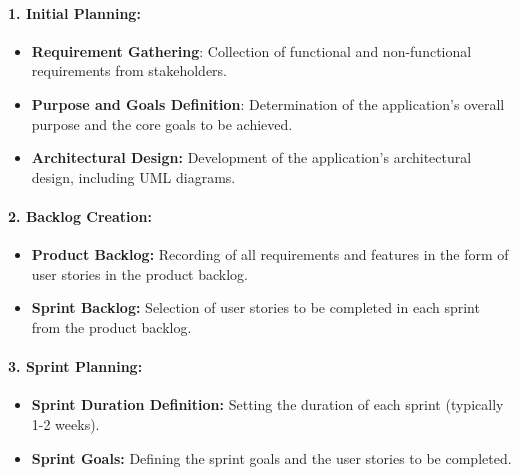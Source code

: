 \documentclass[unnumsec,webpdf,contemporary,large]{oup-authoring-template}%
\theoremstyle{thmstyleone}%
\theoremstyle{thmstyletwo}%
\theoremstyle{thmstylethree}%
\begin{document}
\paragraph{1. Initial Planning:}
\vspace{0.2cm}

\begin{itemize}
    \item \textbf{Requirement Gathering}: Collection of functional and non-functional requirements from stakeholders.
    \vspace{0.1cm}
    \item \textbf{Purpose and Goals Definition}: Determination of the application's overall purpose and the core goals to be achieved.
    \vspace{0.1cm}
    \item \textbf{Architectural Design:} Development of the application's architectural design, including UML diagrams.
\end{itemize}
\vspace{0.1cm}

\paragraph{2. Backlog Creation:}
\vspace{0.2cm}

\begin{itemize}
    \item \textbf{Product Backlog:} Recording of all requirements and features in the form of user stories in the product backlog.
    \vspace{0.1cm}
    \item \textbf{Sprint Backlog:} Selection of user stories to be completed in each sprint from the product backlog.
\end{itemize}
\vspace{0.1cm}

\paragraph{3. Sprint Planning:}
\vspace{0.2cm}

\begin{itemize}
    \item \textbf{Sprint Duration Definition:} Setting the duration of each sprint (typically 1-2 weeks).
    \vspace{0.1cm}
    \item \textbf{Sprint Goals:} Defining the sprint goals and the user stories to be completed.
\end{itemize}
\vspace{0.1cm}
\end{document}
